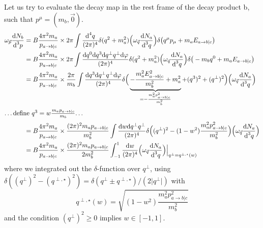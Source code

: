 Let us try to evaluate the decay map in the rest frame of the decay product b, such that $p^\mu=(m_b,\vec{0})$.
\begin{subequations}
    \begin{align}
        \omega_{\vec{p}}\frac{\text{d} N_b}{\text{d}^3p}&=B\frac{4\pi^2m_a}{p_{a\rightarrow b\vert c}}\times2\pi\int\frac{\text{d}^4q}{(2\pi)^4}\delta(q^2+m_a^2)\Big(\omega_{\vec{q}}\frac{\text{d} N_a}{\text{d}^3 q}\Big)\delta\big(q^\mu p_\mu+m_a E_{a\rightarrow b\vert c}\big)\\
        &=B\frac{4\pi^2m_a}{p_{a\rightarrow b\vert c}}\times2\pi\int\frac{\text{d} q^0\text{d} q^3\text{d} q^\perp q^\perp\text{d}\varphi}{(2\pi)^4}\delta(q^2+m_a^2)\Big(\omega_{\vec{q}}\frac{\text{d} N_a}{\text{d}^3 q}\Big)\delta\big(-m_bq^0+m_a E_{a\rightarrow b\vert c}\big)\\
        &=B\frac{4\pi^2m_a}{p_{a\rightarrow b\vert c}}\times\frac{2\pi}{m_b}\int\frac{\text{d} q^3\text{d} q^\perp q^\perp\text{d}\varphi}{(2\pi)^4}\delta\Big(\underbrace{-\frac{m_a^2E_{a\rightarrow b\vert c}^2}{m_b^2}+m_a^2}_{=-\frac{m_a^2p_{a\rightarrow b\vert c}^2}{m_b^2}}+(q^3)^2+(q^\perp)^2\Big)\Big(\omega_{\vec{q}}\frac{\text{d} N_a}{\text{d}^3 q}\Big)\\
        \intertext{\dots define $q^3=w\frac{m_a p_{a\rightarrow b\vert c}}{m_b}$\dots}
        &=B\frac{4\pi^2m_a}{p_{a\rightarrow b\vert c}}\times\frac{(2\pi)^2 m_ap_{a\rightarrow b\vert c}}{m_b^2}\int\frac{\text{d} w\text{d} q^\perp q^\perp}{(2\pi)^4}\delta\Big((q^\perp)^2-(1-w^2)\frac{m_a^2p_{a\rightarrow b\vert c}^2}{m_b^2}\Big)\Big(\omega_{\vec{q}}\frac{\text{d} N_a}{\text{d}^3 q}\Big)\\
        &=B\frac{4\pi^2m_a}{p_{a\rightarrow b\vert c}}\times\frac{(2\pi)^2 m_ap_{a\rightarrow b\vert c}}{2m_b^2}\int_{-1}^1\frac{\text{d} w}{(2\pi)^4}\Big(\omega_{\vec{q}}\frac{\text{d} N_a}{\text{d}^3 q}\Big)\Big\vert_{q^\perp=q^{\perp,\star}(w)}\\
    \end{align}
\end{subequations}
where we integrated out the $\delta$-function over $q^\perp$, using $\delta((q^\perp)^2-(q^{\perp,\star})^2)=\delta(q^\perp\pm q^{\perp,\star})/(2\vert q^\perp\vert)$ with 
\begin{equation}
    q^{\perp,\star}(w)=\sqrt{(1-w^2)\frac{m_a^2p_{a\rightarrow b\vert c}^2}{m_b^2}}
\end{equation}
and the condition $(q^\perp)^2\geq 0$ implies $w\in[-1,1]$.